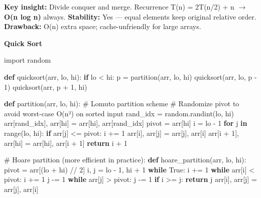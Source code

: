 \documentclass[11pt]{article}
\newenvironment{Shaded}{\begin{snugshade}}{\end{snugshade}}
\newcommand{\BuiltInTok}[1]{\textcolor[rgb]{0.50,0.55,0.55}{#1}}
\newcommand{\CommentTok}[1]{\textcolor[rgb]{0.48,0.49,0.49}{#1}}
\newcommand{\ControlFlowTok}[1]{\textcolor[rgb]{0.99,0.74,0.29}{\textbf{#1}}}
\newcommand{\DecValTok}[1]{\textcolor[rgb]{0.96,0.45,0.00}{#1}}
\newcommand{\ImportTok}[1]{\textcolor[rgb]{0.15,0.68,0.38}{#1}}
\newcommand{\KeywordTok}[1]{\textcolor[rgb]{0.81,0.81,0.76}{\textbf{#1}}}
\newcommand{\NormalTok}[1]{\textcolor[rgb]{0.81,0.81,0.76}{#1}}
\newcommand{\OperatorTok}[1]{\textcolor[rgb]{0.81,0.81,0.76}{#1}}
\newcommand{\VariableTok}[1]{\textcolor[rgb]{0.15,0.68,0.68}{#1}}
\begin{document}
\textbf{Key insight:} Divide conquer and merge. Recurrence T(n) = 2T(n/2) + n \(\rightarrow\) \textbf{O(n log n)} always.
\textbf{Stability:} Yes --- equal elements keep original relative order.
\textbf{Drawback:} O(n) extra space; cache-unfriendly for large arrays.

\textbf{Quick Sort}


\begin{Shaded}
\begin{Highlighting}[]
\ImportTok{import}\NormalTok{ random}

\KeywordTok{def}\NormalTok{ quicksort(arr, lo, hi):}
    \ControlFlowTok{if}\NormalTok{ lo }\OperatorTok{\textless{}}\NormalTok{ hi:}
\NormalTok{        p }\OperatorTok{=}\NormalTok{ partition(arr, lo, hi)}
\NormalTok{        quicksort(arr, lo, p }\OperatorTok{{-}} \DecValTok{1}\NormalTok{)}
\NormalTok{        quicksort(arr, p }\OperatorTok{+} \DecValTok{1}\NormalTok{, hi)}

\KeywordTok{def}\NormalTok{ partition(arr, lo, hi):}
    \CommentTok{\# Lomuto partition scheme}
    \CommentTok{\# Randomize pivot to avoid worst{-}case O(n²) on sorted input}
\NormalTok{    rand\_idx }\OperatorTok{=}\NormalTok{ random.randint(lo, hi)}
\NormalTok{    arr[rand\_idx], arr[hi] }\OperatorTok{=}\NormalTok{ arr[hi], arr[rand\_idx]}
\NormalTok{    pivot }\OperatorTok{=}\NormalTok{ arr[hi]}
\NormalTok{    i }\OperatorTok{=}\NormalTok{ lo }\OperatorTok{{-}} \DecValTok{1}
    \ControlFlowTok{for}\NormalTok{ j }\KeywordTok{in} \BuiltInTok{range}\NormalTok{(lo, hi):}
        \ControlFlowTok{if}\NormalTok{ arr[j] }\OperatorTok{\textless{}=}\NormalTok{ pivot:}
\NormalTok{            i }\OperatorTok{+=} \DecValTok{1}
\NormalTok{            arr[i], arr[j] }\OperatorTok{=}\NormalTok{ arr[j], arr[i]}
\NormalTok{    arr[i }\OperatorTok{+} \DecValTok{1}\NormalTok{], arr[hi] }\OperatorTok{=}\NormalTok{ arr[hi], arr[i }\OperatorTok{+} \DecValTok{1}\NormalTok{]}
    \ControlFlowTok{return}\NormalTok{ i }\OperatorTok{+} \DecValTok{1}

\CommentTok{\# Hoare partition (more efficient in practice):}
\KeywordTok{def}\NormalTok{ hoare\_partition(arr, lo, hi):}
\NormalTok{    pivot }\OperatorTok{=}\NormalTok{ arr[(lo }\OperatorTok{+}\NormalTok{ hi) }\OperatorTok{//} \DecValTok{2}\NormalTok{]}
\NormalTok{    i, j }\OperatorTok{=}\NormalTok{ lo }\OperatorTok{{-}} \DecValTok{1}\NormalTok{, hi }\OperatorTok{+} \DecValTok{1}
    \ControlFlowTok{while} \VariableTok{True}\NormalTok{:}
\NormalTok{        i }\OperatorTok{+=} \DecValTok{1}
        \ControlFlowTok{while}\NormalTok{ arr[i] }\OperatorTok{\textless{}}\NormalTok{ pivot: i }\OperatorTok{+=} \DecValTok{1}
\NormalTok{        j }\OperatorTok{{-}=} \DecValTok{1}
        \ControlFlowTok{while}\NormalTok{ arr[j] }\OperatorTok{\textgreater{}}\NormalTok{ pivot: j }\OperatorTok{{-}=} \DecValTok{1}
        \ControlFlowTok{if}\NormalTok{ i }\OperatorTok{\textgreater{}=}\NormalTok{ j: }\ControlFlowTok{return}\NormalTok{ j}
\NormalTok{        arr[i], arr[j] }\OperatorTok{=}\NormalTok{ arr[j], arr[i]}
\end{Highlighting}
\end{Shaded}
\end{document}
